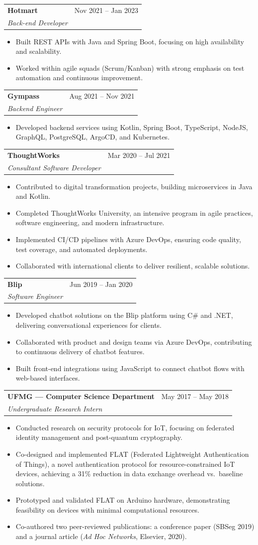 \documentclass[letterpaper,10.5pt]{article}
\makeatletter
\newcommand{\resumeItem}[1]{
  \item\small{#1 \vspace{-2pt}}
}
\newcommand{\resumeSubheading}[4]{
  \vspace{4pt}\item
    \begin{tabular*}{0.97\textwidth}[t]{l@{\extracolsep{\fill}}r}
      \textbf{\color{accent}#1} & \small\color{lightgray}#2 \\
      \textit{\small\color{subaccent}#3} & \\
    \end{tabular*}\vspace{-6pt}
}
\newcommand{\resumeItemListStart}{\begin{itemize}[leftmargin=0.2in]}
\newcommand{\resumeItemListEnd}{\end{itemize}\vspace{-4pt}}
\makeatother
\begin{document}
  \resumeSubheading{Hotmart}{Nov 2021 -- Jan 2023}{Back-end Developer}{}
  \resumeItemListStart
    \resumeItem{Built REST APIs with Java and Spring Boot, focusing on high availability and scalability.}
    \resumeItem{Worked within agile squads (Scrum/Kanban) with strong emphasis on test automation and continuous improvement.}
  \resumeItemListEnd

  \resumeSubheading{Gympass}{Aug 2021 -- Nov 2021}{Backend Engineer}{}
  \resumeItemListStart
    \resumeItem{Developed backend services using Kotlin, Spring Boot, TypeScript, NodeJS, GraphQL, PostgreSQL, ArgoCD, and Kubernetes.}
  \resumeItemListEnd

  \resumeSubheading{ThoughtWorks}{Mar 2020 -- Jul 2021}{Consultant Software Developer}{}
  \resumeItemListStart
    \resumeItem{Contributed to digital transformation projects, building microservices in Java and Kotlin.}
    \resumeItem{Completed ThoughtWorks University, an intensive program in agile practices, software engineering, and modern infrastructure.}
    \resumeItem{Implemented CI/CD pipelines with Azure DevOps, ensuring code quality, test coverage, and automated deployments.}
    \resumeItem{Collaborated with international clients to deliver resilient, scalable solutions.}
  \resumeItemListEnd

  \resumeSubheading{Blip}{Jun 2019 -- Jan 2020}{Software Engineer}{}
  \resumeItemListStart
    \resumeItem{Developed chatbot solutions on the Blip platform using C\# and .NET, delivering conversational experiences for clients.}
    \resumeItem{Collaborated with product and design teams via Azure DevOps, contributing to continuous delivery of chatbot features.}
    \resumeItem{Built front-end integrations using JavaScript to connect chatbot flows with web-based interfaces.}
  \resumeItemListEnd

  \resumeSubheading{UFMG --- Computer Science Department}{May 2017 -- May 2018}{Undergraduate Research Intern}{}
  \resumeItemListStart
    \resumeItem{Conducted research on security protocols for IoT, focusing on federated identity management and post-quantum cryptography.}
    \resumeItem{Co-designed and implemented FLAT (Federated Lightweight Authentication of Things), a novel authentication protocol for resource-constrained IoT devices, achieving a 31\% reduction in data exchange overhead vs.\ baseline solutions.}
    \resumeItem{Prototyped and validated FLAT on Arduino hardware, demonstrating feasibility on devices with minimal computational resources.}
    \resumeItem{Co-authored two peer-reviewed publications: a conference paper (SBSeg 2019) and a journal article (\textit{Ad Hoc Networks}, Elsevier, 2020).}
  \resumeItemListEnd
\end{document}
